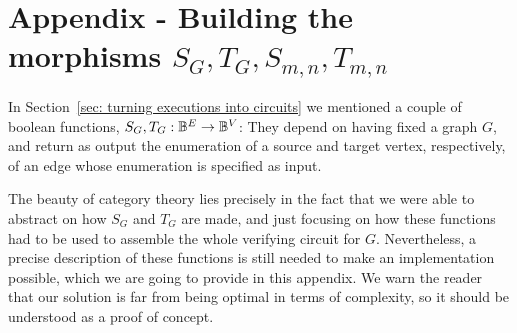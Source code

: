 \section*{Appendix - Building the morphisms $S_G, T_G, S_{m,n}, T_{m,n}$}
%
%
In Section~\ref{sec: turning executions into circuits} we mentioned 
a couple of boolean functions, $S_G, T_G : \mathbb{B}^E \to \mathbb{B}^V$: 
They depend on having fixed a graph $G$, and return 
as output the enumeration of a source and target vertex, respectively, 
of an edge whose enumeration is specified as input.

The beauty of category theory lies precisely in the fact that we were 
able to abstract on how $S_G$ and $T_G$ are made, and just focusing 
on how these functions had to be used to assemble the whole verifying 
circuit for $G$. Nevertheless, a precise
description of these functions is still needed to make an implementation
possible, which we are going to provide in this appendix. We warn the reader 
that our solution is far from being optimal in terms of complexity, so it should be 
understood as a proof of concept.

